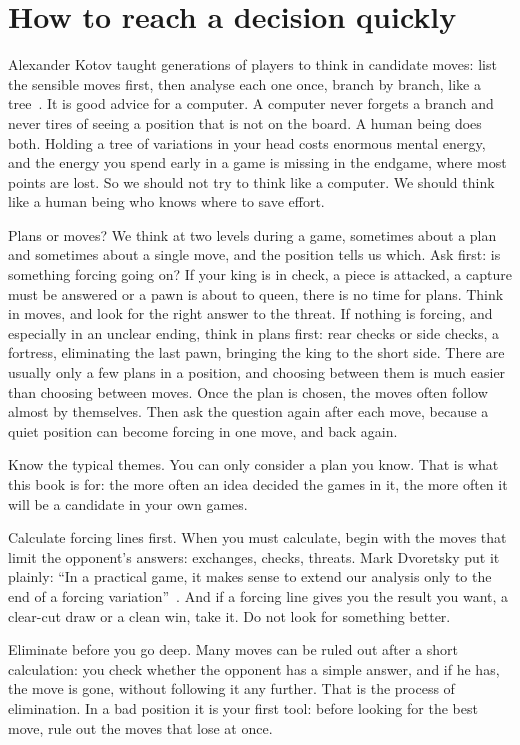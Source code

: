\section*{How to reach a decision quickly}
Alexander Kotov taught generations of players to think in candidate moves: list the sensible
moves first, then analyse each one once, branch by branch, like a
tree~\cite{Kotov:1971-think-like-a-grandmaster}. It is good advice for a computer. A computer never
forgets a branch and never tires of seeing a position that is not on the board. A human being
does both. Holding a tree of variations in your head costs enormous mental energy, and the energy
you spend early in a game is missing in the endgame, where most points are lost. So we should not
try to think like a computer. We should think like a human being who knows where to save effort.

Plans or moves? We think at two levels during a game, sometimes about a plan and sometimes
about a single move, and the position tells us which. Ask first: is something forcing going on?
If your king is in check, a piece is attacked, a capture must be answered or a pawn is about to
queen, there is no time for plans. Think in moves, and look for the right answer to the threat.
If nothing is forcing, and especially in an unclear ending, think in plans first: rear checks or
side checks, a fortress, eliminating the last pawn, bringing the king to the short side. There are
usually only a few plans in a position, and choosing between them is much easier than choosing between
moves. Once the plan is chosen, the moves often follow almost by themselves. Then ask the question
again after each move, because a quiet position can become forcing in one move, and back again.

Know the typical themes. You can only consider a plan you know. That is what this book is
for: the more often an idea decided the games in it, the more often it will be a candidate in your
own games.

Calculate forcing lines first. When you must calculate, begin with the moves that limit the
opponent's answers: exchanges, checks, threats. Mark Dvoretsky put it plainly: ``In a practical
game, it makes sense to extend our analysis only to the end of a forcing
variation''~\cite{Dvoretsky:2008-analytical-manual}. And if a forcing line gives you the result
you want, a clear-cut draw or a clean win, take it. Do not look for something better.

Eliminate before you go deep. Many moves can be ruled out after a short calculation: you
check whether the opponent has a simple answer, and if he has, the move is gone, without following
it any further. That is the process of elimination. In a bad position it is your first tool:
before looking for the best move, rule out the moves that lose at once.

